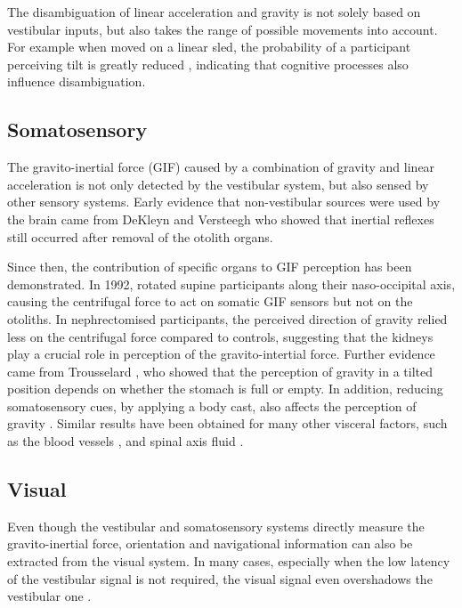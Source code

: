 The disambiguation of linear acceleration and gravity is not solely based on vestibular inputs, but also takes the range of possible movements into account. For example when moved on a linear sled, the probability of a participant perceiving tilt is greatly reduced \cite{wertheim2001}, indicating that cognitive processes also influence disambiguation.


\subsection{Somatosensory}
The gravito-inertial force (GIF) caused by a combination of gravity and linear acceleration is not only detected by the vestibular system, but also sensed by other sensory systems. Early evidence that non-vestibular sources were used by the brain came from DeKleyn and Versteegh \citeyear{dekleyn1933} who showed that inertial reflexes still occurred after removal of the otolith organs.

Since then, the contribution of specific organs to GIF perception has been demonstrated. In 1992, \citeauthor{mittelstaedt1992} rotated supine participants along their naso-occipital axis, causing the centrifugal force to act on somatic GIF sensors  but not on the otoliths. In nephrectomised participants, the perceived direction of gravity relied less on the centrifugal force compared to controls, suggesting that the kidneys play a crucial role in perception of the gravito-intertial force. Further evidence came from Trousselard \citeyear{trousselard2004}, who showed that the perception of gravity in a tilted position depends on whether the stomach is full or empty. In addition, reducing somatosensory cues, by applying a body cast, also affects the perception of gravity \cite{trousselard2004}.  Similar results have been obtained for many other visceral factors, such as the blood vessels \cite{vaitl2002}, and spinal axis fluid \cite{vaitl1997}.


\subsection{Visual}
Even though the vestibular and somatosensory systems directly measure the gravito-inertial force, orientation and navigational information can also be extracted from the visual system. In many cases, especially when the low latency of the vestibular signal is not required, the visual signal even overshadows the vestibular one \cite{wright2005,gaerlan2012}.

